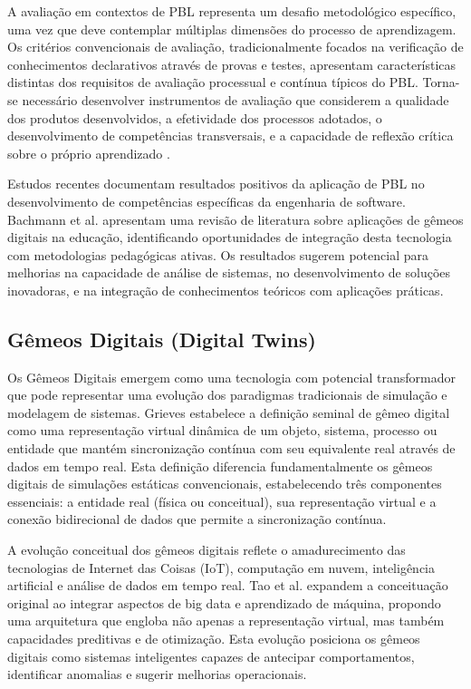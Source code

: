 \documentclass[12pt, a4paper, oneside, brazilian]{abntex2}
\begin{document}
A avaliação em contextos de PBL representa um desafio metodológico específico, uma vez que deve contemplar múltiplas dimensões do processo de aprendizagem. Os critérios convencionais de avaliação, tradicionalmente focados na verificação de conhecimentos declarativos através de provas e testes, apresentam características distintas dos requisitos de avaliação processual e contínua típicos do PBL. Torna-se necessário desenvolver instrumentos de avaliação que considerem a qualidade dos produtos desenvolvidos, a efetividade dos processos adotados, o desenvolvimento de competências transversais, e a capacidade de reflexão crítica sobre o próprio aprendizado \cite{hmelo2004}.

Estudos recentes documentam resultados positivos da aplicação de PBL no desenvolvimento de competências específicas da engenharia de software. Bachmann et al. \cite{bachmann2023} apresentam uma revisão de literatura sobre aplicações de gêmeos digitais na educação, identificando oportunidades de integração desta tecnologia com metodologias pedagógicas ativas. Os resultados sugerem potencial para melhorias na capacidade de análise de sistemas, no desenvolvimento de soluções inovadoras, e na integração de conhecimentos teóricos com aplicações práticas.

\subsection{Gêmeos Digitais (Digital Twins)}

Os Gêmeos Digitais emergem como uma tecnologia com potencial transformador que pode representar uma evolução dos paradigmas tradicionais de simulação e modelagem de sistemas. Grieves \cite{grieves2014} estabelece a definição seminal de gêmeo digital como uma representação virtual dinâmica de um objeto, sistema, processo ou entidade que mantém sincronização contínua com seu equivalente real através de dados em tempo real. Esta definição diferencia fundamentalmente os gêmeos digitais de simulações estáticas convencionais, estabelecendo três componentes essenciais: a entidade real (física ou conceitual), sua representação virtual e a conexão bidirecional de dados que permite a sincronização contínua.

A evolução conceitual dos gêmeos digitais reflete o amadurecimento das tecnologias de Internet das Coisas (IoT), computação em nuvem, inteligência artificial e análise de dados em tempo real. Tao et al. \cite{tao2018} expandem a conceituação original ao integrar aspectos de big data e aprendizado de máquina, propondo uma arquitetura que engloba não apenas a representação virtual, mas também capacidades preditivas e de otimização. Esta evolução posiciona os gêmeos digitais como sistemas inteligentes capazes de antecipar comportamentos, identificar anomalias e sugerir melhorias operacionais.
\end{document}
